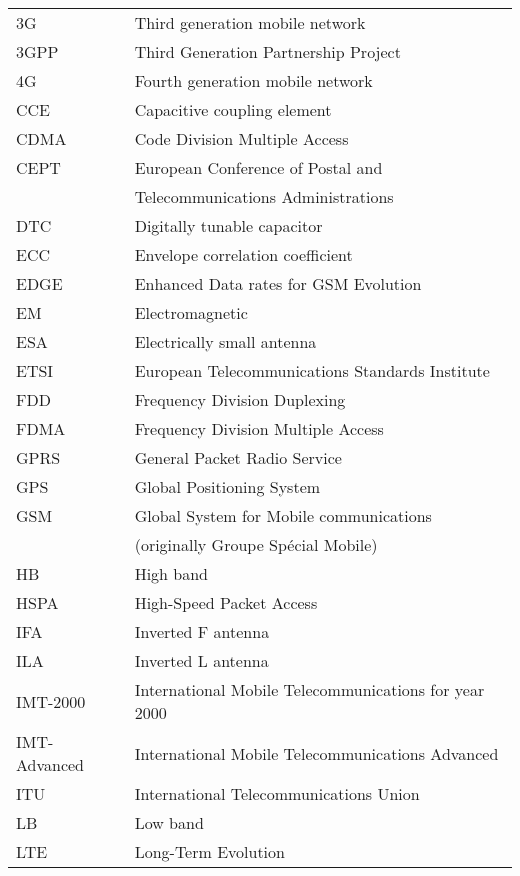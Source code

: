 \begin{tabular}{ll}
3G          & Third generation mobile network \\
3GPP        & Third Generation Partnership Project \\
4G          & Fourth generation mobile network \\
CCE         & Capacitive coupling element\\
CDMA        & Code Division Multiple Access \\
CEPT        & European Conference of Postal and \\
            & Telecommunications Administrations \\
DTC         & Digitally tunable capacitor\\
ECC         & Envelope correlation coefficient\\
EDGE        & Enhanced Data rates for GSM Evolution \\
EM          & Electromagnetic\\
ESA         & Electrically small antenna\\
ETSI        & European Telecommunications Standards Institute\\
FDD         & Frequency Division Duplexing \\
FDMA        & Frequency Division Multiple Access \\
GPRS        & General Packet Radio Service \\
GPS         & Global Positioning System \\
GSM         & Global System for Mobile communications \\
            & (originally Groupe Spécial Mobile) \\
HB          & High band\\
HSPA        & High-Speed Packet Access \\
IFA         & Inverted F antenna\\
ILA         & Inverted L antenna\\
IMT-2000    & International Mobile Telecommunications for year 2000 \\
IMT-Advanced & International Mobile Telecommunications Advanced \\
ITU         & International Telecommunications Union \\
LB          & Low band\\
LTE         & Long-Term Evolution \\

\end{tabular}
